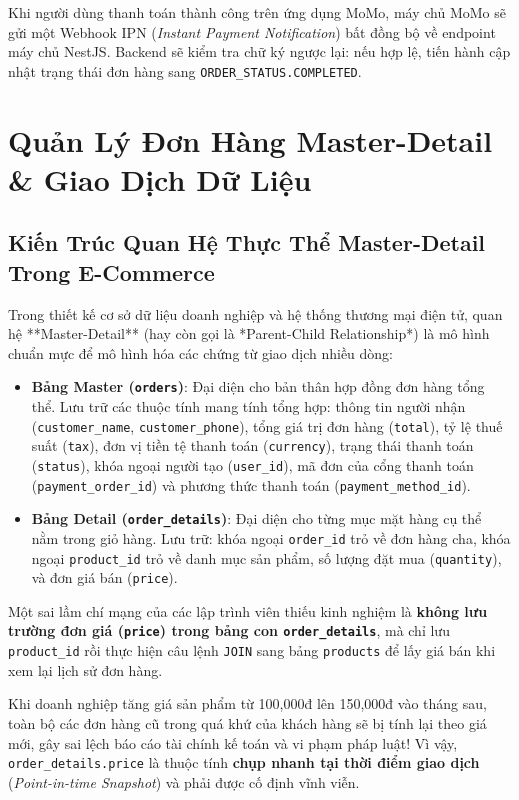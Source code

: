 \documentclass[12pt,a4paper,oneside]{book}
\begin{document}
Khi người dùng thanh toán thành công trên ứng dụng MoMo, máy chủ MoMo sẽ gửi một Webhook IPN (\textit{Instant Payment Notification}) bất đồng bộ về endpoint máy chủ NestJS. Backend sẽ kiểm tra chữ ký ngược lại: nếu hợp lệ, tiến hành cập nhật trạng thái đơn hàng sang \texttt{ORDER\_STATUS.COMPLETED}.

\chapter{Quản Lý Đơn Hàng Master-Detail \& Giao Dịch Dữ Liệu}

\section{Kiến Trúc Quan Hệ Thực Thể Master-Detail Trong E-Commerce}
Trong thiết kế cơ sở dữ liệu doanh nghiệp và hệ thống thương mại điện tử, quan hệ **Master-Detail** (hay còn gọi là *Parent-Child Relationship*) là mô hình chuẩn mực để mô hình hóa các chứng từ giao dịch nhiều dòng:
\begin{itemize}
  \item \textbf{Bảng Master (\texttt{orders})}: Đại diện cho bản thân hợp đồng đơn hàng tổng thể. Lưu trữ các thuộc tính mang tính tổng hợp: thông tin người nhận (\texttt{customer\_name}, \texttt{customer\_phone}), tổng giá trị đơn hàng (\texttt{total}), tỷ lệ thuế suất (\texttt{tax}), đơn vị tiền tệ thanh toán (\texttt{currency}), trạng thái thanh toán (\texttt{status}), khóa ngoại người tạo (\texttt{user\_id}), mã đơn của cổng thanh toán (\texttt{payment\_order\_id}) và phương thức thanh toán (\texttt{payment\_method\_id}).
  \item \textbf{Bảng Detail (\texttt{order\_details})}: Đại diện cho từng mục mặt hàng cụ thể nằm trong giỏ hàng. Lưu trữ: khóa ngoại \texttt{order\_id} trỏ về đơn hàng cha, khóa ngoại \texttt{product\_id} trỏ về danh mục sản phẩm, số lượng đặt mua (\texttt{quantity}), và đơn giá bán (\texttt{price}).
\end{itemize}

\begin{warningbox}
  Một sai lầm chí mạng của các lập trình viên thiếu kinh nghiệm là \textbf{không lưu trường đơn giá (\texttt{price}) trong bảng con \texttt{order\_details}}, mà chỉ lưu \texttt{product\_id} rồi thực hiện câu lệnh \texttt{JOIN} sang bảng \texttt{products} để lấy giá bán khi xem lại lịch sử đơn hàng.
  
  Khi doanh nghiệp tăng giá sản phẩm từ 100,000đ lên 150,000đ vào tháng sau, toàn bộ các đơn hàng cũ trong quá khứ của khách hàng sẽ bị tính lại theo giá mới, gây sai lệch báo cáo tài chính kế toán và vi phạm pháp luật! Vì vậy, \texttt{order\_details.price} là thuộc tính \textbf{chụp nhanh tại thời điểm giao dịch} (\textit{Point-in-time Snapshot}) và phải được cố định vĩnh viễn.
\end{warningbox}
\end{document}
